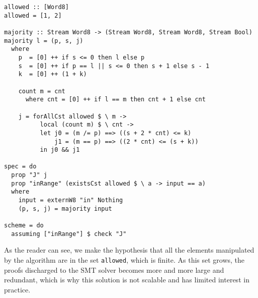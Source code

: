 \begin{lstlisting}[frame=single]
allowed :: [Word8]
allowed = [1, 2]

majority :: Stream Word8 -> (Stream Word8, Stream Word8, Stream Bool)
majority l = (p, s, j)
  where
    p  = [0] ++ if s <= 0 then l else p
    s  = [0] ++ if p == l || s <= 0 then s + 1 else s - 1
    k  = [0] ++ (1 + k)
    
    count m = cnt
      where cnt = [0] ++ if l == m then cnt + 1 else cnt
    
    j = forAllCst allowed $ \ m ->
          local (count m) $ \ cnt ->
          let j0 = (m /= p) ==> ((s + 2 * cnt) <= k)
              j1 = (m == p) ==> ((2 * cnt) <= (s + k))
          in j0 && j1

spec = do
  prop "J" j
  prop "inRange" (existsCst allowed $ \ a -> input == a)
  where
    input = externW8 "in" Nothing
    (p, s, j) = majority input

scheme = do
  assuming ["inRange"] $ check "J"
\end{lstlisting}

As the reader can see, we make the hypothesis that all the elements
manipulated by the algorithm are in the set \texttt{allowed}, which is
finite. As this set grows, the proofs discharged to the SMT solver
becomes more and more large and redundant, which is why this solution
is not  scalable and has limited interest in practice.
